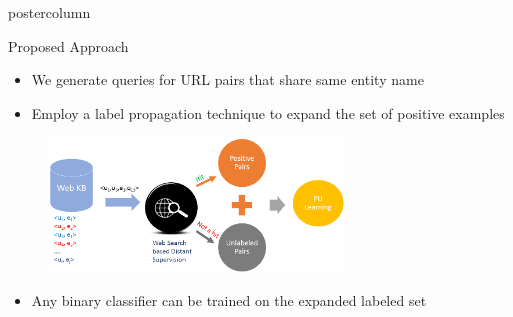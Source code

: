 \documentclass{beamer}
\begin{document}
\begin{frame}
\begin{columns}
\begin{column}{.5\textwidth}
\begin{beamercolorbox}[center]{postercolumn}
\begin{minipage}{.98\textwidth}
{\begin{myblock}{Proposed Approach}
              \begin{itemize}
		\item  We generate queries for URL pairs that share same entity name
		\item  Employ a label propagation technique to expand the set of positive examples
     \end{itemize}     
						\vspace{0.5em}
						\begin{figure}
							\begin{minipage}{0.94\textwidth}
								\centering\includegraphics[height=0.7\textwidth, width=0.7\textwidth, keepaspectratio]{img/FlowWWW.png}
							\end{minipage}
						\end{figure}
             \begin{itemize}
		\item Any binary classifier can be trained on the expanded labeled set 
     \end{itemize}     
					\end{myblock}\vfill

}
\end{minipage}
\end{beamercolorbox}
\end{column}
\end{columns}
\end{frame}
\end{document}
